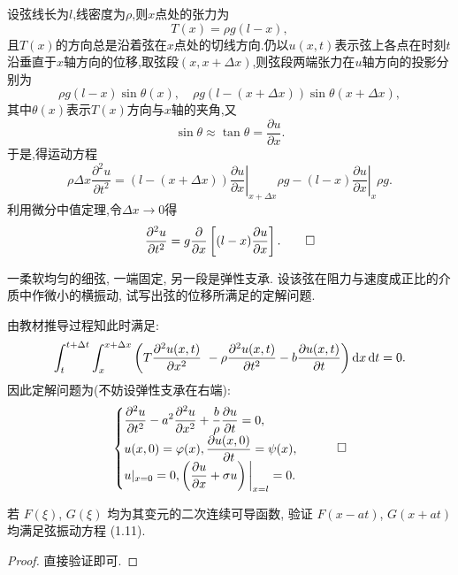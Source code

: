 \begin{solve}
	设弦线长为$l$,线密度为$\rho$,则$x$点处的张力为
	$$T(x)=\rho g(l-x),$$
	且$T(x)$的方向总是沿着弦在$x$点处的切线方向.仍以$u(x,t)$表示弦上各点在时刻$t$沿垂直于$x$轴方向的位移,取弦段$(x,x+\Delta x)$,则弦段两端张力在$u$轴方向的投影分别为
	\[\rho g(l-x)\sin\theta(x),\quad\rho g(l-(x+\Delta x))\sin\theta(x+\Delta x),\]
	其中$\theta(x)$表示$T(x)$方向与$x$轴的夹角,又
	\[\sin\theta\approx\tan\theta=\frac{\partial u}{\partial x}.\]
	于是,得运动方程
	\[\rho\Delta x\dfrac{\partial^2u}{\partial t^2}=\left.(l-(x+\Delta x))\dfrac{\partial u}{\partial x}\right|_{x+\Delta x}\rho g-(l-x)\left.\dfrac{\partial u}{\partial x}\right|_x\rho g.\]
	利用微分中值定理,令$\Delta x\to0$得
	\[\dfrac{\partial^2u}{\partial t^2}=g\dfrac{\partial}{\partial x}\left[(l-x)\dfrac{\partial u}{\partial x}\right].\qedhere\]
\end{solve}


\begin{exercise}
  一柔软均匀的细弦, 一端固定, 另一段是弹性支承.
  设该弦在阻力与速度成正比的介质中作微小的横振动, 试写出弦的位移所满足的定解问题.
\end{exercise}

\begin{solve}
  由教材推导过程知此时满足:
  \[\int_t^{t+\Delta t}\int_x^{x+\Delta x}\left(T\frac{\partial^2u(x,t)}{\partial x^2}\
    - \rho\frac{\partial^2u(x,t)}{\partial t^2}
    - b\frac{\partial u(x,t)}{\partial t}\right)\mathop{}\!\mathrm{d} x\mathop{}\!\mathrm{d} t = 0.\]
  因此定解问题为(不妨设弹性支承在右端):
  \[\begin{cases}
    \displaystyle\frac{\partial^2u}{\partial t^2}
    - a^2\frac{\partial^2u}{\partial x^2}
    + \frac{b}{\rho}\frac{\partial u}{\partial t}
    = 0, \\
    \displaystyle u(x,0) = \varphi(x),\frac{\partial u(x,0)}{\partial t} = \psi(x),\\
    \displaystyle u|_{x=0}=0,\left(\frac{\partial u}{\partial x}
    + \sigma u\right)\bigg|_{x=l}=0.
  \end{cases}\qedhere\]
\end{solve}


\begin{exercise}
  若 $F(\xi)$, $G(\xi)$ 均为其变元的二次连续可导函数,
  验证 $F(x-at)$, $G(x+at)$ 均满足弦振动方程 (1.11).
\end{exercise}

\begin{proof}
  直接验证即可.
\end{proof}


